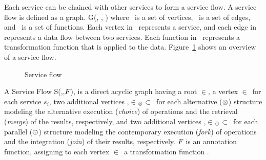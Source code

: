 Each service can be chained with other services to form a service flow.
A service flow is defined as a graph. G(\V, \E, \F{}) where \V\, is a set of vertices, \E\, is a set of edges, and \F{}\, is a set of functions.
Each vertex in \V\, represents a service, and each edge in \E\, represents a data flow between two services.
Each function in \F{}\, represents a transformation function that is applied to the data.
Figure~\ref{fig:service_flow} shows an overview of a service flow.
\def\s{s}
\begin{figure}[h!]
  \centering
  \caption{Service flow}
  \label{fig:service_flow}
\end{figure}
\begin{definition} \label{def:service_flow}
  A Service Flow S(\V,\E,$F_{}$), is a direct acyclic graph having a root $\in$\V, a vertex $\in$\V\ for each service $s_i$,
  two additional vertices ,$\in$\V$_{\otimes}$$\subset$\V\ for each alternative ($\otimes$) structure modeling the alternative execution (\emph{choice}) of operations and the retrieval (\emph{merge}) of the results,
        respectively, and two additional vertices ,$\in$\V$_{\oplus}$$\subset$\V\ for each parallel ($\oplus$) structure modeling the contemporary execution (\emph{fork}) of operations and the integration (\emph{join}) of their results, respectively. $F_{}{}$ is an annotation function, assigning to each vertex $\in$\V\ a transformation function .
\end{definition}
